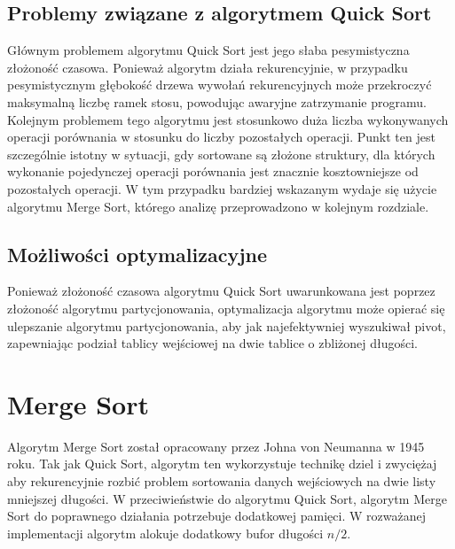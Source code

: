 \begin{figure}[H]
	\centering
	
	\caption[]{}
	\label{fig:quick-sort-density}
\end{figure}

\subsection{Problemy związane z algorytmem Quick Sort}
Głównym problemem algorytmu Quick Sort jest jego słaba pesymistyczna złożoność czasowa. Ponieważ algorytm działa rekurencyjnie, w przypadku pesymistycznym głębokość drzewa wywołań rekurencyjnych może przekroczyć maksymalną liczbę ramek stosu, powodując awaryjne zatrzymanie programu.\\

Kolejnym problemem tego algorytmu jest stosunkowo duża liczba wykonywanych operacji porównania w stosunku do liczby pozostałych operacji. Punkt ten jest szczególnie istotny w sytuacji, gdy sortowane są złożone struktury, dla których
wykonanie pojedynczej operacji porównania jest znacznie kosztowniejsze od pozostałych operacji. W tym przypadku bardziej wskazanym wydaje się użycie algorytmu Merge Sort, którego analizę przeprowadzono w kolejnym rozdziale.

\subsection{Możliwości optymalizacyjne}
Ponieważ złożoność czasowa algorytmu Quick Sort uwarunkowana jest poprzez złożoność algorytmu partycjonowania, optymalizacja algorytmu może opierać się ulepszanie algorytmu partycjonowania, aby jak najefektywniej wyszukiwał pivot, zapewniając podział tablicy wejściowej na dwie tablice o zbliżonej długości.
 

\section{Merge Sort}


Algorytm Merge Sort został opracowany przez Johna von Neumanna w 1945 roku. Tak jak Quick Sort, algorytm ten wykorzystuje
technikę dziel i zwyciężaj aby rekurencyjnie rozbić problem sortowania danych wejściowych na dwie listy mniejszej długości.
W przeciwieństwie do algorytmu Quick Sort, algorytm Merge Sort do poprawnego działania potrzebuje dodatkowej pamięci.
W rozważanej implementacji algorytm alokuje dodatkowy bufor długości $n/2$.\\

